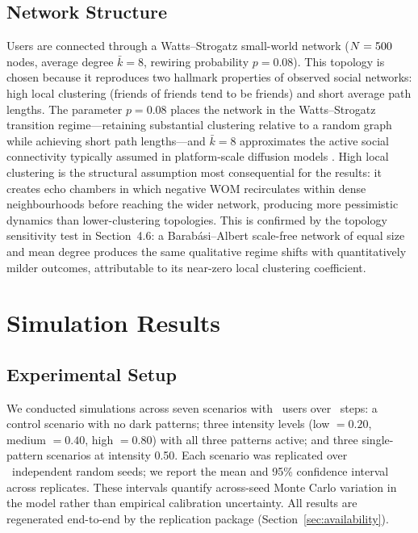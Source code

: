\documentclass[a4paper,fleqn]{cas-sc}
\begin{document}
\subsection{Network Structure}
Users are connected through a Watts--Strogatz small-world network ($N=500$ nodes, average degree $\bar{k}=8$, rewiring probability $p=0.08$). This topology is chosen because it reproduces two hallmark properties of observed social networks: high local clustering (friends of friends tend to be friends) and short average path lengths. The parameter $p=0.08$ places the network in the Watts--Strogatz transition regime---retaining substantial clustering relative to a random graph while achieving short path lengths---and $\bar{k}=8$ approximates the active social connectivity typically assumed in platform-scale diffusion models \citep{goldenberg2001}. High local clustering is the structural assumption most consequential for the results: it creates echo chambers in which negative WOM recirculates within dense neighbourhoods before reaching the wider network, producing more pessimistic dynamics than lower-clustering topologies. This is confirmed by the topology sensitivity test in Section~4.6: a Barab\'asi--Albert scale-free network of equal size and mean degree produces the same qualitative regime shifts with quantitatively milder outcomes, attributable to its near-zero local clustering coefficient.

\section{Simulation Results}
\subsection{Experimental Setup}
We conducted simulations across seven scenarios with \numAgents\ users over \maxSteps\ steps: a control scenario with no dark patterns; three intensity levels (low $=0.20$, medium $=0.40$, high $=0.80$) with all three patterns active; and three single-pattern scenarios at intensity 0.50. Each scenario was replicated over \numReplicates\ independent random seeds; we report the mean and 95\% confidence interval across replicates. These intervals quantify across-seed Monte Carlo variation in the model rather than empirical calibration uncertainty. All results are regenerated end-to-end by the replication package (Section~\ref{sec:availability}).
\end{document}
